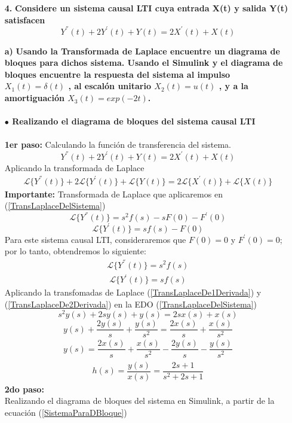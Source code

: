 \documentclass[11pt,a4paper]{article}
\begin{document}
{{\begin{enumerate}
	\newpage
	
	\item[\textbf{4.}]\textbf{Considere un sistema causal LTI cuya entrada X(t) y salida Y(t) satisfacen $$Y^{''}(t)+2Y^{'}(t)+Y(t)=2X^{'}(t)+X(t)$$}
	
	\item[\textbf{a)}]
	\textbf{Usando la Transformada de Laplace encuentre un diagrama de bloques para dichos sistema. Usando el Simulink y el diagrama de bloques encuentre la respuesta del sistema al impulso $X_{1}(t)=\delta(t)$ , al escalón unitario $X_{2}(t)=u(t)$ , y a la amortiguación $X_{3}(t)=exp(-2t)$.}\\\\
	\textbf{$\bullet$ Realizando el diagrama de bloques del sistema causal LTI }\\\\
	\textbf{1er paso:} Calculando la función de transferencia del sistema.
	$$Y^{''}(t)+2Y^{'}(t)+Y(t)=2X^{'}(t)+X(t)$$
Aplicando la transformada de Laplace
	\begin{eqnarray}
	\label{TransLaplaceDelSistema}
		\mathcal{L}{\lbrace Y^{''}(t)\rbrace}+2 \mathcal{L}{ \lbrace Y^{'}(t)\rbrace}+ \mathcal{L}{ \lbrace Y(t)\rbrace }=2 \mathcal{L}{\lbrace X^{'}(t)\rbrace}+ \mathcal{L}{ \lbrace X(t) \rbrace}
	\end{eqnarray}
	\textbf{Importante:} Transformada de Laplace que aplicaremos en (\ref{TransLaplaceDelSistema})\\ 
	$$\mathcal{L}{\lbrace Y^{''}(t)\rbrace}=s^2f(s)-sF(0)-F^{'}(0)$$
	$$\mathcal{L}{ \lbrace Y^{'}(t)\rbrace}=sf(s)-F(0)$$
	Para este sistema causal LTI, consideraremos que $F(0)=0$ y $F^{'}(0)=0$; por lo tanto, obtendremos lo siguiente:
	\begin{eqnarray}
	\label{TransLaplaceDe2Derivada}
		\mathcal{L}{\lbrace Y^{''}(t)\rbrace}=s^2f(s)
	\end{eqnarray}
	\begin{eqnarray}
	\label{TransLaplaceDe1Derivada}
		\mathcal{L}{ \lbrace Y^{'}(t)\rbrace}=sf(s)
	\end{eqnarray}
	Aplicando la transfomadas de Laplace (\ref{TransLaplaceDe1Derivada})
y (\ref{TransLaplaceDe2Derivada}) en la EDO (\ref{TransLaplaceDelSistema})
	$$s^2y(s)+2sy(s)+y(s)=2sx(s)+x(s)$$
	$$y(s)+ \dfrac{2y(s)}{s}+ \dfrac{y(s)}{s^2}= \dfrac{2x(s)}{s}+ \dfrac{x(s)}{s^2}$$
	\begin{eqnarray}
	\label{SistemaParaDBloque}
		y(s)= \dfrac{2x(s)}{s}+ \dfrac{x(s)}{s^2}- \dfrac{2y(s)}{s}- \dfrac{y(s)}{s^2}
	\end{eqnarray}
	\begin{eqnarray}
	\label{Función transferencia4}
	\boxed{h(s)=\dfrac{y(s)}{x(s)}=\dfrac{2s+1}{s^2 +2s+1}}
	\end{eqnarray}
	\newpage
\textbf{2do paso:}\\
Realizando el diagrama de bloques del sistema en Simulink, a partir de la ecuación (\ref{SistemaParaDBloque})
	

\end{enumerate}}}
\end{document}
